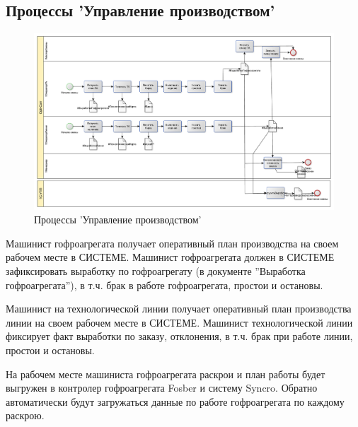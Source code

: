 \subsection{Процессы 'Управление производством'}
%
\begin{figure}
\begin{center}
  \includegraphics[angle=90, height=0.9\textheight, keepaspectratio]{Pics/4_Выработка.pdf}
\end{center}
  \caption{Процессы 'Управление производством'}
  \label{pic:Schema_4}
\end{figure}




 Машинист гофроагрегата получает оперативный план производства на своем рабочем месте в СИСТЕМЕ. Машинист гофроагрегата должен в СИСТЕМЕ зафиксировать выработку по гофроагрегату (в документе ''Выработка гофроагрегата''), в т.ч. брак в работе гофроагрегата, простои и остановы.

Машинист на технологической линии получает оперативный план производства линии на своем рабочем месте в СИСТЕМЕ. Машинист технологической линии фиксирует факт выработки по заказу, отклонения, в т.ч. брак при работе линии, простои и остановы.


На рабочем месте машиниста гофроагрегата раскрои и план работы будет выгружен в контролер гофроагрегата Fosber и систему Syncro. Обратно автоматически будут загружаться данные по работе гофроагрегата по каждому раскрою. 


